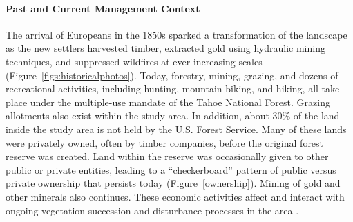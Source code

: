 
\paragraph*{Past and Current Management Context}

The arrival of Europeans in the 1850s sparked a transformation of the landscape as the new settlers harvested timber, extracted gold using hydraulic mining techniques, and suppressed wildfires at ever-increasing scales \citep{Storer1963} (Figure~\ref{figs:historicalphotos}). Today, forestry, mining, grazing, and dozens of recreational activities, including hunting, mountain biking, and hiking, all take place under the multiple-use mandate of the Tahoe National Forest. Grazing allotments also exist within the study area. In addition, 
about 30\% of the land inside the study area is not held by the U.S. Forest Service. Many of these lands were privately owned, often by timber companies, before the original forest reserve was created. Land within the reserve was occasionally given to other public or private entities, leading to a ``checkerboard'' pattern of public versus private ownership that persists today (Figure~\ref{ownership}). Mining of gold and other minerals also continues. These economic activities affect and interact with ongoing vegetation succession and disturbance processes in the area \citep{USDAForestService2014}.

